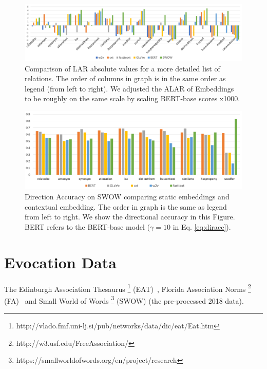 \documentclass[letterpaper]{article} %
\begin{document}
\begin{table}[ht]
\label{tab:5}
\end{table}


\begin{figure}[ht]
  \includegraphics[width=\linewidth]{abs_lar_detail.png}
  \caption{Comparison of LAR absolute values for a more detailed list of relations. The order of columns in graph is in the same order as legend (from left to right). We adjusted the ALAR of Embeddings to be roughly on the same scale by scaling BERT-base scores x1000.}
  \label{fig:abs_lar_detail}
\end{figure}

\begin{figure}[ht]
  \includegraphics[width=\linewidth]{dir_acc.png}
  \caption{Direction Accuracy on SWOW comparing static embeddings and contextual embedding. The order in graph is the same as legend from left to right. We show the directional accuracy in this Figure. BERT refers to the BERT-base model ($\gamma=10$ in Eq. \ref{eq:diracc}). }
  \label{fig:dir_acc}
\end{figure}

\section{Evocation Data}
The Edinburgh Association Thesaurus \footnote{http://vlado.fmf.uni-lj.si/pub/networks/data/dic/eat/Eat.htm}  (EAT)~\citep{kiss1973associative}, Florida Association Norms \footnote{http://w3.usf.edu/FreeAssociation/} (FA)~\citep{nelson2004university} and Small World of Words \footnote{https://smallworldofwords.org/en/project/research} (SWOW) \cite{de2019small} (the pre-processed 2018 data). 
\end{document}
